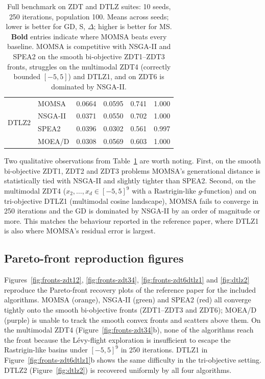 \documentclass[11pt,a4paper]{article}
\begin{document}
\begin{table}[H]
\begin{tabular}{llrrrr}
\midrule
\multirow{4}{*}{DTLZ2}
 & MOMSA   & 0.0664  & 0.0595  & 0.741 & 1.000 \\
 & NSGA-II & 0.0371  & 0.0550  & 0.702 & 1.000 \\
 & SPEA2   & 0.0396  & 0.0302  & 0.561 & 0.997 \\
 & MOEA/D  & 0.0308  & 0.0569  & 0.603 & 1.000 \\
\bottomrule
\end{tabular}
\caption{Full benchmark on ZDT and DTLZ suites: 10 seeds, 250 iterations,
population 100. Means across seeds; lower is better for GD, S, $\Delta$;
higher is better for MS. \textbf{Bold} entries indicate where MOMSA
beats every baseline. MOMSA is competitive with NSGA-II and SPEA2 on
the smooth bi-objective ZDT1--ZDT3 fronts, struggles on the multimodal
ZDT4 (correctly bounded $[-5,5]$) and DTLZ1, and on ZDT6 is dominated
by NSGA-II.}
\label{tab:benchmark-full}
\end{table}

Two qualitative observations from Table~\ref{tab:benchmark-full} are
worth noting. First, on the smooth bi-objective ZDT1, ZDT2 and ZDT3
problems MOMSA's generational distance is statistically tied with
NSGA-II and slightly tighter than SPEA2. Second, on the multimodal ZDT4
($x_2,\ldots,x_d \in [-5,5]^9$ with a Rastrigin-like
$g$-function) and on tri-objective DTLZ1 (multimodal cosine landscape),
MOMSA fails to converge in 250 iterations and the GD is dominated by
NSGA-II by an order of magnitude or more. This matches the behaviour
reported in the reference paper, where DTLZ1 is also where MOMSA's
residual error is largest.

\FloatBarrier
\clearpage

\subsection{Pareto-front reproduction figures}
\label{sec:findings-figures}

Figures~\ref{fig:fronts-zdt12}, \ref{fig:fronts-zdt34},
\ref{fig:fronts-zdt6dtlz1} and \ref{fig:dtlz2} reproduce the
Pareto-front recovery plots of the reference paper for the included
algorithms. MOMSA (orange), NSGA-II (green) and SPEA2 (red) all converge
tightly onto the smooth bi-objective fronts (ZDT1--ZDT3 and ZDT6); MOEA/D
(purple) is unable to track the smooth convex fronts and scatters
above them. On the multimodal ZDT4 (Figure~\ref{fig:fronts-zdt34}b),
none of the algorithms reach the front because the L\'evy-flight
exploration is insufficient to escape the Rastrigin-like basins under
$[-5,5]^9$ in 250 iterations. DTLZ1 in Figure~\ref{fig:fronts-zdt6dtlz1}b
shows the same difficulty in the tri-objective setting. DTLZ2
(Figure~\ref{fig:dtlz2}) is recovered uniformly by all four algorithms.
\end{document}
